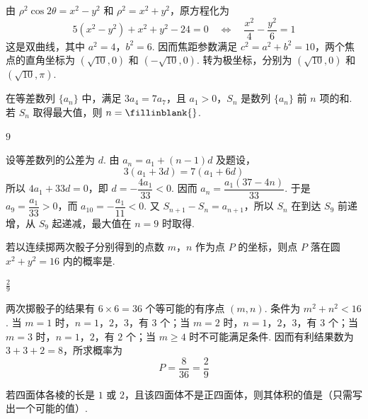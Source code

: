 \documentclass[UTF8,a4paper,oneside,11pt]{ctexbook}
\begin{document}
\begin{solution}
由 \(\rho^2\cos2\theta=x^2-y^2\) 和 \(\rho^2=x^2+y^2\)，原方程化为
\[
5(x^2-y^2)+x^2+y^2-24=0
\quad\Longleftrightarrow\quad
\frac{x^2}{4}-\frac{y^2}{6}=1
\]
这是双曲线，其中 \(a^2=4\)，\(b^2=6\). 因而焦距参数满足 \(c^2=a^2+b^2=10\)，两个焦点的直角坐标为 \((\sqrt{10},0)\) 和 \((-\sqrt{10},0)\). 转为极坐标，分别为 \(\left(\sqrt{10},0\right)\) 和 \(\left(\sqrt{10},\pi\right)\).
\end{solution}

\begin{problem}
在等差数列 \(\{a_n\}\) 中，满足 \(3a_4 = 7a_7\)，且 \(a_1 > 0\)，\(S_n\) 是数列 \(\{a_n\}\) 前 \(n\) 项的和. 若 \(S_n\) 取得最大值，则 \(n=\fillinblank{}\).
\end{problem}

\begin{answer}
\(9\)
\end{answer}

\begin{solution}
设等差数列的公差为 \(d\). 由 \(a_n=a_1+(n-1)d\) 及题设，
\[
3(a_1+3d)=7(a_1+6d)
\]
所以 \(4a_1+33d=0\)，即 \(d=-\dfrac{4a_1}{33}<0\). 因而 \(a_n=\dfrac{a_1(37-4n)}{33}\). 于是 \(a_9=\dfrac{a_1}{33}>0\)，而 \(a_{10}=-\dfrac{a_1}{11}<0\). 又 \(S_{n+1}-S_n=a_{n+1}\)，所以 \(S_n\) 在到达 \(S_9\) 前递增，从 \(S_9\) 起递减，最大值在 \(n=9\) 时取得.
\end{solution}

\begin{problem}
若以连续掷两次骰子分别得到的点数 \(m\)，\(n\) 作为点 \(P\) 的坐标，则点 \(P\) 落在圆 \(x^2 + y^2 = 16\) 内的概率是\fillinblank{}.
\end{problem}

\begin{answer}
\(\frac{2}{9}\)
\end{answer}

\begin{solution}
两次掷骰子的结果有 \(6\times6=36\) 个等可能的有序点 \((m,n)\). 条件为 \(m^2+n^2<16\). 当 \(m=1\) 时，\(n=1\)，\(2\)，\(3\)，有 \(3\) 个；当 \(m=2\) 时，\(n=1\)，\(2\)，\(3\)，有 \(3\) 个；当 \(m=3\) 时，\(n=1\)，\(2\)，有 \(2\) 个；当 \(m\ge4\) 时不可能满足条件. 因而有利结果数为 \(3+3+2=8\)，所求概率为
\[
P=\frac{8}{36}=\frac29
\]
\end{solution}

\begin{problem}
若四面体各棱的长是 \(1\) 或 \(2\)，且该四面体不是正四面体，则其体积的值是\fillinblank{}（只需写出一个可能的值）.
\end{problem}
\end{document}
